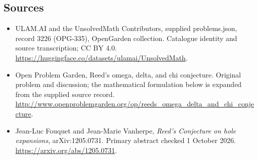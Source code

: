 \documentclass[11pt,a4paper]{article}
\begin{document}
\subsection{Sources}
\begin{itemize}
\item[S1] ULAM.AI and the UnsolvedMath Contributors, supplied problems.json, record 3226 (OPG-335), OpenGarden collection. Catalogue identity and source transcription; CC BY 4.0.
\url{https://huggingface.co/datasets/ulamai/UnsolvedMath}.
\item[S2] Open Problem Garden, Reed's omega, delta, and chi conjecture. Original problem and discussion; the mathematical formulation below is expanded from the supplied source record.
\url{http://www.openproblemgarden.org/op/reeds_omega_delta_and_chi_conjecture}.
\item[R1] Jean-Luc Fouquet and Jean-Marie Vanherpe,
\emph{Reed's Conjecture on hole expansions}, arXiv:1205.0731.
Primary abstract checked 1 October 2026.
\url{https://arxiv.org/abs/1205.0731}.
\end{itemize}
\end{document}
